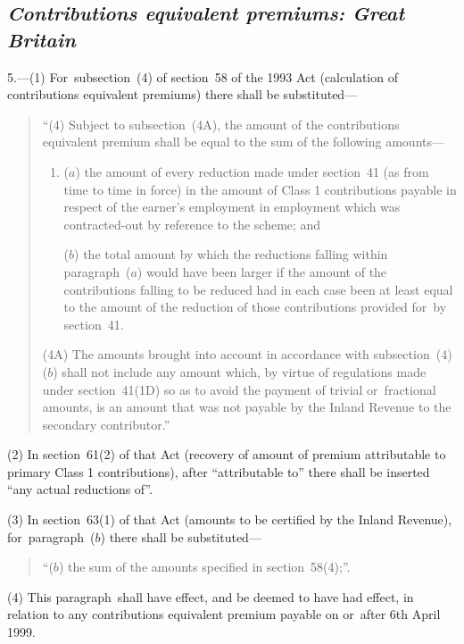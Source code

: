 \documentclass[12pt,a4paper]{article}
\begin{document}
\subsection*{\itshape Contributions equivalent premiums: Great Britain}

5.---(1) For~subsection~(4)  of section~58 of the 1993 Act (calculation of contributions equivalent premiums) there shall be substituted—
\begin{quotation}
“(4) Subject to subsection~(4A), the amount of the contributions equivalent premium shall be equal to the sum of the following amounts—
\begin{enumerate}\item[]
($a$) the amount of every reduction made under section~41 (as from time to time in force) in the amount of Class 1 contributions payable in respect of the earner’s employment in employment which was contracted-out by reference to the scheme; and

($b$) the total amount by which the reductions falling within paragraph~($a$)  would have been larger if the amount of the contributions falling to be reduced had in each case been at least equal to the amount of the reduction of those contributions provided for~by section~41. 
\end{enumerate}

(4A) The amounts brought into account in accordance with subsection~(4)($b$)  shall not include any amount which, by virtue of regulations made under section~41(1D) so as to avoid the payment of trivial or~fractional amounts, is an amount that was not payable by the Inland Revenue to the secondary contributor.”
\end{quotation}

(2) In section~61(2)  of that Act (recovery of amount of premium attributable to primary Class 1 contributions), after “attributable to” there shall be inserted “any actual reductions of”.

(3) In section~63(1)  of that Act (amounts to be certified by the Inland Revenue), for~paragraph~($b$)  there shall be substituted—
\begin{quotation}
“($b$) the sum of the amounts specified in section~58(4);”.
\end{quotation}

(4) This paragraph~shall have effect, and be deemed to have had effect, in relation to any contributions equivalent premium payable on or~after 6th April 1999. 

\end{document}
